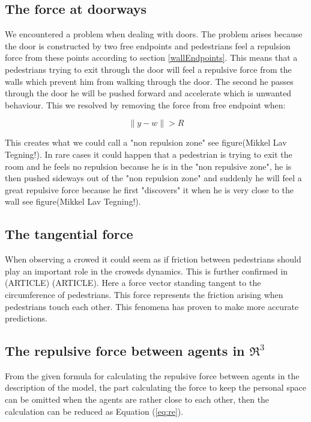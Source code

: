 \subsection{The force at doorways}
We encountered a problem when dealing with doors. The problem arises because 
the door is constructed by two free endpoints and pedestrians feel a repulsion 
force from these points according to section \ref{wallEndpoints}. This means 
that a pedestrians trying to exit through the door will feel a repulsive force 
from the walls which prevent him from walking through the door. The second he 
passes through the door he will be pushed forward and accelerate which is unwanted 
behaviour. This we resolved by removing the force from free endpoint when:

\begin{equation}
\| y - w \| > R
\end{equation}

This creates what we could call a "non repulsion zone" see figure(Mikkel Lav Tegning!).
In rare cases it could happen that a pedestrian is trying to exit the room and he feels 
no repulsion because he is in the "non repulsive zone", he is then pushed sideways out 
of the "non repulsion zone" and suddenly he will feel a great repulsive force because 
he first "discovers" it when he is very close to the wall see figure(Mikkel Lav Tegning!).

\subsection{The tangential force}
When observing a crowed it could seem as if friction between pedestrians should play 
an important role in the croweds dynamics. This is further confirmed in (ARTICLE) (ARTICLE). 
Here a force vector standing tangent to the circumference of pedestrians. This force 
represents the friction arising when pedestrians touch each other. This fenomena has 
proven to make more accurate predictions.


\subsection{The repulsive force between agents in $ \Re ^{3}$}
From the given formula for calculating the repulsive force between agents in the 
description of the model, the part calculating the force to keep the personal space 
can be omitted when the agents are rather close to each other, then the calculation 
can be reduced as Equation (\ref{eq:re}).


